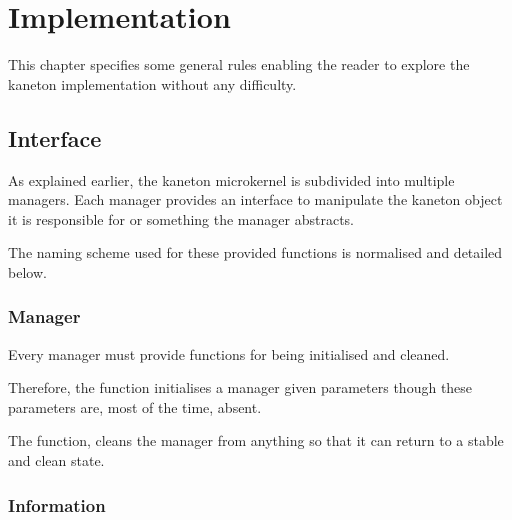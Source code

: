 %
%
%
%
%
%

%
%

\chapter{Implementation}
\label{chapter:implementation}

This chapter specifies some general rules enabling the reader to explore
the kaneton implementation without any difficulty.

\newpage

%
%

%
%

\section{Interface}

As explained earlier, the kaneton microkernel is subdivided into multiple
managers. Each manager provides an interface to manipulate the kaneton object
it is responsible for or something the manager abstracts.

The naming scheme used for these provided functions is normalised and
detailed below.


\subsection*{Manager}

Every manager must provide functions for being initialised and cleaned.

Therefore, the  function initialises a manager given
parameters though these parameters are, most of the time, absent.

The  function, cleans the manager from anything so that it
can return to a stable and clean state.


\subsection*{Information}

